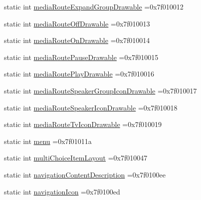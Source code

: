 \begin{DoxyCompactItemize}
\item 
static int \hyperlink{classandroid_1_1support_1_1graphics_1_1drawable_1_1animated_1_1R_1_1attr_a4949c28b4f28fe5e2f60b4bc0f92d40b}{media\+Route\+Expand\+Group\+Drawable} =0x7f010012
\item 
static int \hyperlink{classandroid_1_1support_1_1graphics_1_1drawable_1_1animated_1_1R_1_1attr_abaf370b487676e5ca74a76416558df15}{media\+Route\+Off\+Drawable} =0x7f010013
\item 
static int \hyperlink{classandroid_1_1support_1_1graphics_1_1drawable_1_1animated_1_1R_1_1attr_a9e0d8a374159b7919c88a5cb87d27d55}{media\+Route\+On\+Drawable} =0x7f010014
\item 
static int \hyperlink{classandroid_1_1support_1_1graphics_1_1drawable_1_1animated_1_1R_1_1attr_a41708a6bb4ec9343f86fc44bd21cce35}{media\+Route\+Pause\+Drawable} =0x7f010015
\item 
static int \hyperlink{classandroid_1_1support_1_1graphics_1_1drawable_1_1animated_1_1R_1_1attr_a7de7ab04699a219cefd77ab6662b4cbf}{media\+Route\+Play\+Drawable} =0x7f010016
\item 
static int \hyperlink{classandroid_1_1support_1_1graphics_1_1drawable_1_1animated_1_1R_1_1attr_aa69caf87283d06d9d82af87644b5adac}{media\+Route\+Speaker\+Group\+Icon\+Drawable} =0x7f010017
\item 
static int \hyperlink{classandroid_1_1support_1_1graphics_1_1drawable_1_1animated_1_1R_1_1attr_a8b7b32e09e965faab37c64db9116fb53}{media\+Route\+Speaker\+Icon\+Drawable} =0x7f010018
\item 
static int \hyperlink{classandroid_1_1support_1_1graphics_1_1drawable_1_1animated_1_1R_1_1attr_a471aad203b2f2679dcd72644ee7b90c4}{media\+Route\+Tv\+Icon\+Drawable} =0x7f010019
\item 
static int \hyperlink{classandroid_1_1support_1_1graphics_1_1drawable_1_1animated_1_1R_1_1attr_a57e39b3a218ebd3989ffee2d334a6f54}{menu} =0x7f01011a
\item 
static int \hyperlink{classandroid_1_1support_1_1graphics_1_1drawable_1_1animated_1_1R_1_1attr_ac58051b80b2c3e0fc9f29b4aaa9d0671}{multi\+Choice\+Item\+Layout} =0x7f010047
\item 
static int \hyperlink{classandroid_1_1support_1_1graphics_1_1drawable_1_1animated_1_1R_1_1attr_ac5f0ecf40dedb2ae0bd6adca442f7a12}{navigation\+Content\+Description} =0x7f0100ee
\item 
static int \hyperlink{classandroid_1_1support_1_1graphics_1_1drawable_1_1animated_1_1R_1_1attr_a94a7f2b22303d96b3a08bf09c514c2fb}{navigation\+Icon} =0x7f0100ed

\end{DoxyCompactItemize}
